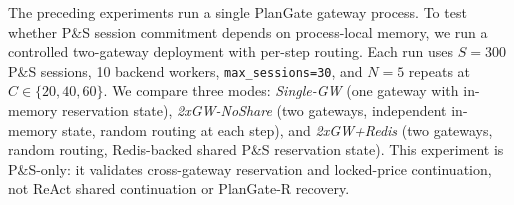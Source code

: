 \documentclass[sigconf,review,anonymous]{acmart}
\begin{document}
The preceding experiments run a single PlanGate gateway process.
To test whether P\&S session commitment depends on process-local memory, we run a controlled two-gateway deployment with per-step routing.
Each run uses $S{=}300$ P\&S sessions, 10 backend workers, \texttt{max\_sessions=30}, and $N{=}5$ repeats at $C\in\{20,40,60\}$.
We compare three modes: \emph{Single-GW} (one gateway with in-memory reservation state), \emph{2xGW-NoShare} (two gateways, independent in-memory state, random routing at each step), and \emph{2xGW+Redis} (two gateways, random routing, Redis-backed shared P\&S reservation state).
This experiment is P\&S-only: it validates cross-gateway reservation and locked-price continuation, not ReAct shared continuation or PlanGate-R recovery.

\begin{table}[t]
\centering
\caption{Multi-gateway P\&S shared-state validation ($S{=}300$, $N{=}5$ repeats).
StateMiss\% is the percentage of sessions that encounter a continuation state miss; it is the primary semantic-failure metric for this experiment.
Cross\% is the percentage of sessions whose steps execute on both gateway nodes.
MaxAct is the peak admitted-session count reconstructed from traces.}
\label{tab:multigateway}
\small
{}
\end{table}
\end{document}

